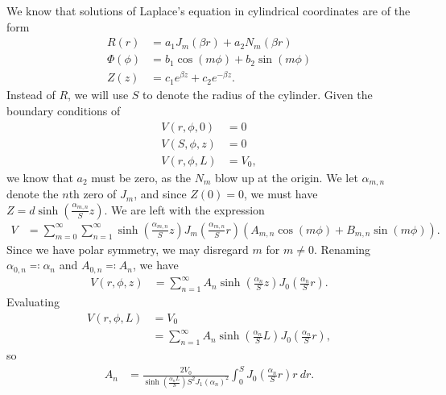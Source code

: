 \documentclass[10pt]{mypackage}
\begin{document}
\begin{solution}[41.14]
  We know that solutions of Laplace's equation in cylindrical coordinates are of the form
  \begin{align*}
    R(r) &= a_1J_m\left( \beta r \right) + a_2N_m\left( \beta r \right)\\
    \Phi(\phi) &= b_1\cos\left( m\phi \right) + b_2\sin\left( m\phi \right)\\
    Z(z) &= c_1e^{\beta z} + c_2e^{-\beta z}.
  \end{align*}
  Instead of $R$, we will use $S$ to denote the radius of the cylinder. Given the boundary conditions of
  \begin{align*}
    V\left(r,\phi,0\right) &= 0\\
    V\left( S,\phi,z \right) &= 0\\
    V\left( r,\phi,L \right) &= V_0,
  \end{align*}
  we know that $a_2$ must be zero, as the $N_m$ blow up at the origin. We let $\alpha_{m,n}$ denote the $n$th zero of $J_m$, and since $Z(0) = 0$, we must have $Z = d\sinh\left( \frac{\alpha_{m,n}}{S}z \right)$. We are left with the expression
  \begin{align*}
    V &= \sum_{m=0}^{\infty}\sum_{n=1}^{\infty}\sinh\left( \frac{\alpha_{m,n}}{S}z \right)J_{m}\left( \frac{\alpha_{m,n}}{S}r \right) \left( A_{m,n}\cos\left( m\phi \right) + B_{m,n}\sin\left( m\phi \right) \right).
  \end{align*}
  Since we have polar symmetry, we may disregard $m$ for $m\neq 0$. Renaming $\alpha_{0,n}\eqcolon \alpha_n$ and $A_{0,n}\eqcolon A_n$, we have
  \begin{align*}
    V(r,\phi,z) &= \sum_{n=1}^{\infty}A_n\sinh\left( \frac{\alpha_{n}}{S} z \right)J_0\left( \frac{\alpha_n}{S} r \right).
  \end{align*}
  Evaluating
  \begin{align*}
    V\left( r,\phi,L \right) &= V_0\\
                             &= \sum_{n=1}^{\infty}A_n\sinh\left( \frac{\alpha_n}{S}L \right)J_0\left( \frac{\alpha_n}{S}r \right),
  \end{align*}
  so
  \begin{align*}
    A_n &= \frac{2V_0}{\sinh\left( \frac{\alpha_n L}{S} \right)S^2J_1\left( \alpha_n \right)^2} \int_{0}^{S} J_0\left( \frac{\alpha_n}{S}r \right) r\:dr.
  \end{align*}
\end{solution}
\end{document}
